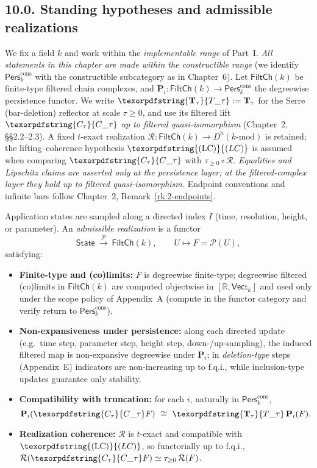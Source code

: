 \documentclass[11pt]{article}
\numberwithin{equation}{section}
\theoremstyle{plain}
\theoremstyle{definition}
\theoremstyle{remark}
\DeclareRobustCommand{\hyp}{\nobreakdash-}
\newcommand{\Pers}{\mathsf{Pers}}
\newcommand{\Rfun}{\mathcal{R}}
\theoremstyle{plain}
\theoremstyle{definition}
\numberwithin{equation}{section}
\theoremstyle{definition}
\DeclareRobustCommand{\FiltCh}[1]{\mathsf{FiltCh}(#1)}
\DeclareRobustCommand{\Perskft}{\Pers^{\mathrm{cons}}_{k}}
\DeclareRobustCommand{\Ttau}{\texorpdfstring{\ensuremath{\mathbf{T}_{\tau}}}{T\_\tau}}
\DeclareRobustCommand{\Ctau}{\texorpdfstring{\ensuremath{C_{\tau}}}{C\_\tau}}
\DeclareRobustCommand{\LC}{\texorpdfstring{\ensuremath{\mathrm{(LC)}}}{(LC)}}
\numberwithin{equation}{section}
\theoremstyle{plain}
\theoremstyle{definition}
\theoremstyle{remark}
\providecommand{\Cfun}[1]{\mathsf{C}_{#1}}
\providecommand{\Tfun}[1]{\mathbf{T}_{#1}}
\providecommand{\Ctau}{\Cfun{\tau}}
\providecommand{\Ttau}{\Tfun{\tau}}
\begin{document}
\subsection*{10.0. Standing hypotheses and admissible realizations}
We fix a field \(k\) and work within the \emph{implementable range} of Part~I.
\emph{All statements in this chapter are made within the constructible range}
(we identify \(\Perskft\) with the constructible subcategory as in Chapter~6).
Let \(\FiltCh{k}\) be finite\hyp type filtered chain complexes, and \(\mathbf{P}_i:\FiltCh{k}\to\Perskft\) the degreewise persistence functor.
We write \(\Ttau:=\mathbf{T}_\tau\) for the Serre (bar\hyp deletion) reflector at scale \(\tau\ge 0\), and use its filtered lift \(\Ctau\) \emph{up to filtered quasi\hyp isomorphism} (Chapter~2, §§2.2–2.3).
A fixed \(t\)\hyp exact realization \(\Rfun:\FiltCh{k}\to D^{\mathrm{b}}(k\text{-mod})\) is retained; the lifting–coherence hypothesis \(\LC\) is assumed when comparing \(\Ctau\) with \(\tau_{\ge 0}\!\circ\!\Rfun\).
\emph{Equalities and Lipschitz claims are asserted only at the persistence layer; at the filtered\hyp complex layer they hold up to filtered quasi\hyp isomorphism.}
Endpoint conventions and infinite bars follow Chapter~2, Remark~\ref{rk:2-endpoints}.

Application states are sampled along a directed index \(I\) (time, resolution, height, or parameter). An \emph{admissible realization} is a functor
\[
  \mathsf{State}\ \xrightarrow{\ \mathcal{P}\ }\ \FiltCh{k},\qquad U\longmapsto F=\mathcal{P}(U),
\]
satisfying:
\begin{itemize}
  \item \textbf{Finite\hyp type and (co)limits:} \(F\) is degreewise finite\hyp type; degreewise filtered (co)limits in \(\FiltCh{k}\) are computed objectwise in \([\mathbb{R},\mathsf{Vect}_k]\) and used only under the scope policy of Appendix~A (compute in the functor category and verify return to \(\Pers^{\mathrm{cons}}_k\)).
  \item \textbf{Non\hyp expansiveness under persistence:} along each directed update (e.g.\ time step, parameter step, height step, down\hyp /up\hyp sampling), the induced filtered map is non\hyp expansive degreewise under \(\mathbf{P}_i\);
  in \emph{deletion\hyp type} steps (Appendix~E) indicators are non\hyp increasing up to f.q.i., while inclusion\hyp type updates guarantee only stability.
  \item \textbf{Compatibility with truncation:} for each \(i\), naturally in \(\Perskft\),
  \[
    \mathbf{P}_i(\Ctau F)\ \cong\ \Ttau\,\mathbf{P}_i(F).
  \]
  \item \textbf{Realization coherence:} \(\Rfun\) is \(t\)\hyp exact and compatible with \(\LC\), so functorially up to f.q.i.,
  \(\Rfun(\Ctau F)\simeq \tau_{\ge 0}\,\Rfun(F)\).
\end{itemize}
\end{document}
